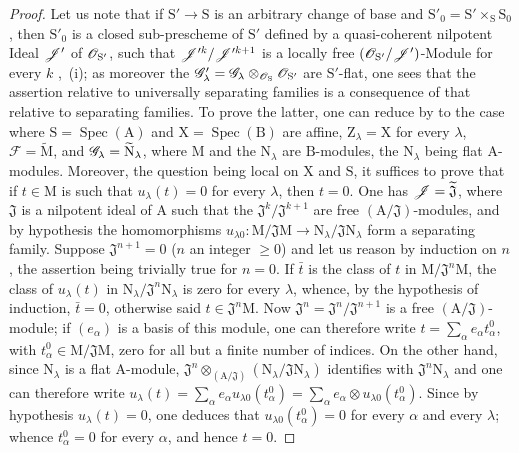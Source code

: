 \begin{proof}
Let us note that if $\mathrm{S}'\to\mathrm{S}$ is an arbitrary change of base and $\mathrm{S}'_0=\mathrm{S}'\times_\mathrm{S}\mathrm{S}_0$, then $\mathrm{S}'_0$ is a closed sub-prescheme of $\mathrm{S}'$ defined by a quasi-coherent nilpotent Ideal $\mathscr{J}'$ of $\mathscr{O}_{\mathrm{S}'}$, such that $\mathscr{J}'^k/\mathscr{J}'^{k+1}$ is a locally free $(\mathscr{O}_{\mathrm{S}'}/\mathscr{J}')$-Module for every $k$ ,~(i); as moreover the $\mathscr{G}'_\lambda=\mathscr{G}_\lambda\otimes_{\mathscr{O}_\mathrm{S}}\mathscr{O}_{\mathrm{S}'}$ are $\mathrm{S}'$-flat, one sees that the assertion relative to universally separating families is a consequence of that relative to separating families.
To prove the latter, one can reduce by  to the case where $\mathrm{S}=\operatorname{Spec}(\mathrm{A})$ and $\mathrm{X}=\operatorname{Spec}(\mathrm{B})$ are affine, $\mathrm{Z}_\lambda=\mathrm{X}$ for every $\lambda$, $\mathscr{F}=\widetilde{\mathrm{M}}$, and $\mathscr{G}_\lambda=\widetilde{\mathrm{N}}_\lambda$, where $\mathrm{M}$ and the $\mathrm{N}_\lambda$ are $\mathrm{B}$-modules, the $\mathrm{N}_\lambda$ being flat $\mathrm{A}$-modules.
Moreover, the question being local on $\mathrm{X}$ and $\mathrm{S}$, it suffices to prove that if $t\in\mathrm{M}$ is such that $u_\lambda(t)=0$ for every $\lambda$, then $t=0$.
One has $\mathscr{J}=\widetilde{\mathfrak{J}}$, where $\mathfrak{J}$ is a nilpotent ideal of $\mathrm{A}$ such that the $\mathfrak{J}^k/\mathfrak{J}^{k+1}$ are free $(\mathrm{A}/\mathfrak{J})$-modules, and by hypothesis the homomorphisms $u_{\lambda 0}:\mathrm{M}/\mathfrak{J}\mathrm{M}\to\mathrm{N}_\lambda/\mathfrak{J}\mathrm{N}_\lambda$ form a separating family.
Suppose $\mathfrak{J}^{n+1}=0$ ($n$ an integer $\geq 0$) and let us reason by induction on $n$, the assertion being trivially true for $n=0$.
If $\bar{t}$ is the class of $t$ in $\mathrm{M}/\mathfrak{J}^n\mathrm{M}$, the class of $u_\lambda(t)$ in $\mathrm{N}_\lambda/\mathfrak{J}^n\mathrm{N}_\lambda$ is zero for every $\lambda$, whence, by the hypothesis of induction, $\bar{t}=0$, otherwise said $t\in\mathfrak{J}^n\mathrm{M}$.
Now $\mathfrak{J}^n=\mathfrak{J}^n/\mathfrak{J}^{n+1}$ is a free $(\mathrm{A}/\mathfrak{J})$-module; if $(e_\alpha)$ is a basis of this module, one can therefore write $t=\sum_\alpha e_\alpha t_\alpha^0$, with $t_\alpha^0\in\mathrm{M}/\mathfrak{J}\mathrm{M}$, zero for all but a finite number of indices.
On the other hand, since $\mathrm{N}_\lambda$ is a flat $\mathrm{A}$-module, $\mathfrak{J}^n\otimes_{(\mathrm{A}/\mathfrak{J})}(\mathrm{N}_\lambda/\mathfrak{J}\mathrm{N}_\lambda)$ identifies with $\mathfrak{J}^n\mathrm{N}_\lambda$ and one can therefore write $u_\lambda(t)=\sum_\alpha e_\alpha u_{\lambda 0}(t_\alpha^0)=\sum_\alpha e_\alpha\otimes u_{\lambda 0}(t_\alpha^0)$.
Since by hypothesis $u_\lambda(t)=0$, one deduces that $u_{\lambda 0}(t_\alpha^0)=0$ for every $\alpha$ and every $\lambda$; whence $t_\alpha^0=0$ for every $\alpha$, and hence $t=0$.
\end{proof}

